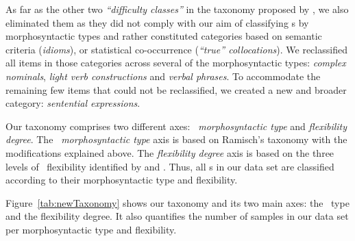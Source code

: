 \documentclass[output=paper]{langsci/langscibook}
\begin{document}
 
As far as the other two \textit{``difficulty classes''} in the taxonomy proposed by \cite{Ramisch:2012,Ramisch:2015}, we also eliminated them as they did not comply with our aim of classifying \mwe s by morphosyntactic types and rather constituted categories based on semantic criteria (\textit{idioms}), or statistical co-occurrence (\textit{``true'' collocations}).
We reclassified all items in those categories across several of the morphosyntactic types: \textit{complex nominals}, \textit{light verb constructions} and \textit{verbal phrases}.
To accommodate the remaining few items that could not be reclassified, we created a new and broader category: \textit{sentential expressions}.

\newpage 
Our taxonomy comprises two different axes: \textit{\mwe\ morphosyntactic type} and \textit{flexibility degree}.
The \textit{\mwe\ morphosyntactic type} axis is based on Ramisch's \citeyearpar{Ramisch:2012,Ramisch:2015} taxonomy with the modifications explained above.
The \textit{flexibility degree} axis is based on the three levels of \mwe\ flexibility identified by \cite{Sag:2002} and \cite{Baldwin2010}.
Thus, all \mwe s in our data set are classified according to their morphosyntactic type and flexibility.

Figure~\ref{tab:newTaxonomy} 
shows our taxonomy and its two main axes: the \mwe\ type and the flexibility degree.
It also quantifies the number of samples in our data set per morphosyntactic type and flexibility. 
\end{document}
